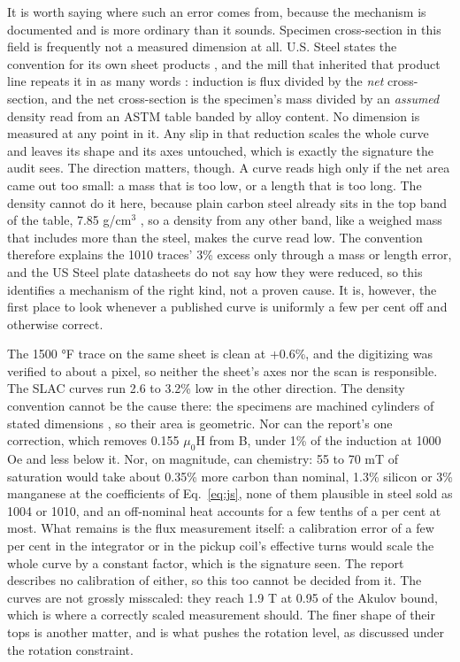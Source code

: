 \documentclass[
  11pt,
]{article}
\newcounter{none} %
\begin{document}
It is worth saying where such an error comes from, because the mechanism is documented and is more ordinary than it sounds. Specimen cross-section in this field is frequently not a measured dimension at all. U.S. Steel states the convention for its own sheet products \cite{uss1978}, and the mill that inherited that product line repeats it in as many words \cite{clf2026}: induction is flux divided by the \emph{net} cross-section, and the net cross-section is the specimen's mass divided by an \emph{assumed} density read from an ASTM table banded by alloy content. No dimension is measured at any point in it. Any slip in that reduction scales the whole curve and leaves its shape and its axes untouched, which is exactly the signature the audit sees. The direction matters, though. A curve reads high only if the net area came out too small: a mass that is too low, or a length that is too long. The density cannot do it here, because plain carbon steel already sits in the top band of the table, 7.85 g/cm\(^{3}\) \cite{uss1978}, so a density from any other band, like a weighed mass that includes more than the steel, makes the curve read low. The convention therefore explains the 1010 traces' 3\% excess only through a mass or length error, and the US Steel plate datasheets do not say how they were reduced, so this identifies a mechanism of the right kind, not a proven cause. It is, however, the first place to look whenever a published curve is uniformly a few per cent off and otherwise correct.

The 1500 °F trace on the same sheet is clean at +0.6\%, and the digitizing was verified to about a pixel, so neither the sheet's axes nor the scan is responsible. The SLAC curves run 2.6 to 3.2\% low in the other direction. The density convention cannot be the cause there: the specimens are machined cylinders of stated dimensions \cite{cobb1989}, so their area is geometric. Nor can the report's one correction, which removes 0.155 \(\mu_0\)H from B, under 1\% of the induction at 1000 Oe and less below it. Nor, on magnitude, can chemistry: 55 to 70 mT of saturation would take about 0.35\% more carbon than nominal, 1.3\% silicon or 3\% manganese at the coefficients of Eq.~\eqref{eq:js}, none of them plausible in steel sold as 1004 or 1010, and an off-nominal heat accounts for a few tenths of a per cent at most. What remains is the flux measurement itself: a calibration error of a few per cent in the integrator or in the pickup coil's effective turns would scale the whole curve by a constant factor, which is the signature seen. The report describes no calibration of either, so this too cannot be decided from it. The curves are not grossly misscaled: they reach 1.9 T at 0.95 of the Akulov bound, which is where a correctly scaled measurement should. The finer shape of their tops is another matter, and is what pushes the rotation level, as discussed under the rotation constraint.
\end{document}

